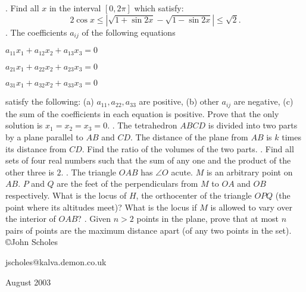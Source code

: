 \nopagenumbers
{}
\vskip 25pt
. Find all $x$ in the interval $[0,2\pi]$ which satisfy: $$2\cos x\le|\sqrt{1+\sin{2x}}-\sqrt{1-\sin{2x}}|\le\sqrt2.$$
\vskip 12pt
. The coefficients $a_{ij}$ of the following equations

$a_{11}x_1+a_{12}x_2+a_{13}x_3=0$

$a_{21}x_1+a_{22}x_2+a_{23}x_3=0$

$a_{31}x_1+a_{32}x_2+a_{33}x_3=0$

\noindent satisfy the following: (a) $a_{11},a_{22},a_{33}$ are positive, (b) other $a_{ij}$ are negative, (c) the sum of the coefficients in each equation is positive. Prove that the only solution is $x_1=x_2=x_3=0$.
\vskip 12pt
. The tetrahedron $ABCD$ is divided into two parts by a plane parallel to $AB$ and $CD$. The distance of the plane from $AB$ is $k$ times its distance from $CD$. Find the ratio of the volumes of the two parts.
\vskip 12pt
. Find all sets of four real numbers such that the sum of any one and the product of the other three is $2$.
\vskip 12pt
. The triangle $OAB$ has $\angle O$ acute. $M$ is an arbitrary point on $AB$. $P$ and $Q$ are the feet of the perpendiculars from $M$ to $OA$ and $OB$ respectively. What is the locus of $H$, the orthocenter of the triangle $OPQ$ (the point where its altitudes meet)? What is the locus if $M$ is allowed to vary over the interior of $OAB$?
\vskip 12pt
. Given $n>2$ points in the plane, prove that at most $n$ pairs of points are the maximum distance apart (of any two points in the set).
\vskip 20pt
\noindent \copyright John Scholes

\noindent jscholes@kalva.demon.co.uk

 August 2003

\bye
